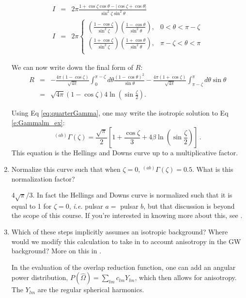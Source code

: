 \documentclass[article, onecolumn, ,nofootinbib,nopreprintnumbers]{revtex4}
\newcommand{\bea}{\begin{eqnarray}}
\newcommand{\eea}{\end{eqnarray}}
\begin{document}
\begin{enumerate}
\begin{eqnarray}
I&=&2\pi\frac{1+\cos\zeta\cos\theta-|\cos\zeta+\cos\theta|}{\sin^2\zeta\sin^2\theta}\label{eq:An1}\\
I&=&2\pi
 \left\{
\begin{array}{lc}
\left(\frac{1-\cos\zeta}{\sin^2\zeta}\right)\left(\frac{1-\cos\theta}{\sin^2\theta}\right), &		 	0<\theta<\pi-\zeta 	\\
\left(\frac{1+\cos\zeta}{\sin^2\zeta}\right)\left(\frac{1+\cos\theta}{\sin^2\theta}\right), &	 \pi-\zeta<\theta<\pi \label{eq:R00pm}\\
\end{array}
\right.
\end{eqnarray}

We can now write down the final form of $R$:
\bea
R&=&-\frac{4\pi(1-\cos\zeta)}{\sqrt{4\pi}}\!\int_0^{\pi-\zeta}\!\!\! d\theta  \frac{(1-\cos\theta)^2}{\sin\theta}-\frac{4\pi(1+\cos\zeta)}{\sqrt{4\pi}}\!\int_{\pi-\zeta}^\pi\!\!\! d\theta\sin\theta\\
&=&\sqrt{4\pi}(1-\cos\zeta)4\ln\left(\sin\frac{\zeta}{2}\right).
\eea

 Using Eq \eqref{eq:quarterGamma}, one may write the isotropic solution to Eq \eqref{e:Gammalm_ex}:
\begin{equation}
{}^{(ab)}\Gamma(\zeta)=\frac{\sqrt{\pi}}{2}\left[1+\frac{\cos\zeta}{3}+4\beta\ln\left(\sin\frac{\zeta}{2}\right)\right]\, .
\end{equation}
This equation is the Hellings and Downs curve up to a multiplicative factor.

\item Normalize this curve such that when $\zeta=0$, $^{(ab)}\Gamma(\zeta)=0.5$. What is this normalization factor?

$4\sqrt{\pi}/3$. In fact the Hellings and Downs curve is normalized such that it is equal to 1 for  $\zeta = 0$, {\it i.e.} pulsar $a =$ pulsar $b$, but that discussion is beyond the scope of this course. If you're interested in knowing more about this, see \cite{MingarelliSidery:2014}.


\item Which of these steps implicitly assumes an isotropic background? Where would we modify this calculation to take in to account anisotropy in the GW background? More on this in \cite{MingarelliEtAl:2013}.

In the evaluation of the overlap reduction function, one can add an angular power distribution, $P(\hat\Omega)=\sum_{lm}c_{lm}Y_{lm}$, which then allows for anisotropy. The $Y_{lm}$ are the regular spherical harmonics.
\end{enumerate}








\end{document}
